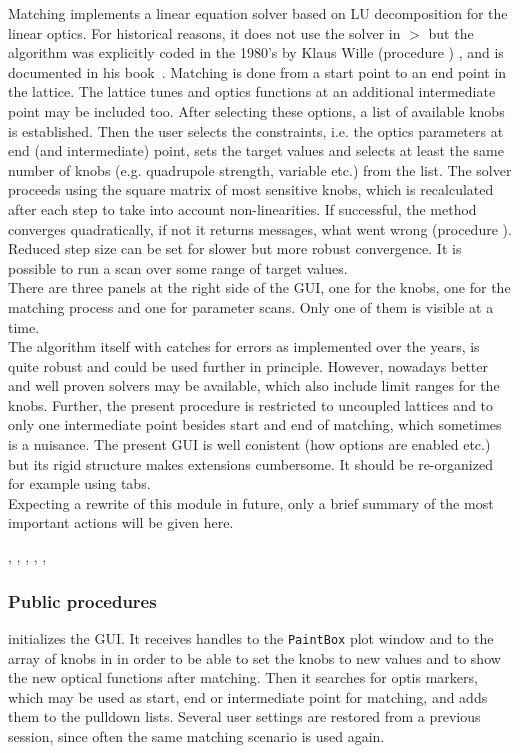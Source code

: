 \documentclass[12pt]{article}
\newcommand\code[1]{{\tt #1}}
\newcommand\guico[1]{{\color{blue}\code{#1}}}
\newcommand{\unico}[1]{{\color{burntorange}\code{#1}}}
\newcommand{\prcod}[2]{\opauni{#1}$>$\unico{#2}}
\newcommand{\opagui}[1]{\colorbox{blue!20}{{\color{black}\code{#1}}}}
\newcommand{\ogui}[1]{\hyperref[#1]{\opagui{#1}}}
\newcommand{\opaguif}[1]{\colorbox{violet!30}{{\color{black}\code{#1}}}}
\newcommand{\oguif}[1]{\hyperref[#1]{\opaguif{#1}}}
\newcommand{\opauni}[1]{\colorbox{orange!30}{{\color{black}\code{#1}}}}
\newcommand{\ouni}[1]{\hyperref[#1]{\opauni{#1}}}
\newcommand{\uses}[1]{\flushleft {\bf Uses:} #1}
\newcommand{\desc}[1]{#1}
\newcommand{\ppro}[1]{\subsubsection*{Public procedures} #1}
\newcommand{\todo}[1]{{\color{red} #1}}
\begin{document}
\desc{Matching implements a linear equation solver based on LU decomposition for the linear optics. For historical reasons, it does not use the solver in \prcod{mathlib}{LUDCMP,LUBKSB} but the algorithm was explicitly coded in the 1980's by Klaus Wille (procedure \guico{Step}) , and is documented in his book~\cite{kwille}. Matching is done from a start point to an end point in the lattice. The lattice tunes and optics functions at an additional intermediate point may be included too.  After selecting these options, a list of available knobs is established. Then the user selects the constraints, i.e. the optics parameters at end (and intermediate) point, sets the target values and selects at least the same number of knobs (e.g. quadrupole strength, variable etc.) from the list. The solver proceeds using the square matrix of most sensitive knobs, which is recalculated after each step to take into account non-linearities. If successful, the method converges quadratically, if not it returns messages, what went wrong (procedure \guico{Term}). Reduced step size can be set for slower but more robust convergence. It is possible to run a scan over some range of target values. \\
There are three panels at the right side of the GUI, one for the knobs, one for the matching process and one for parameter scans. Only one of them is visible at a time.\\
\todo{The algorithm itself with catches for errors as implemented over the years, is quite robust and could be used further in principle. However, nowadays better and well proven solvers may be available, which also include limit ranges for the knobs. Further, the present procedure is restricted to uncoupled lattices and to only one intermediate point besides start and end of matching, which sometimes is a nuisance. The present GUI is well conistent (how options are enabled etc.) but its rigid structure makes extensions cumbersome. It should be re-organized for example using tabs.}\\
Expecting a rewrite of this module in future, only a brief summary of the most important actions will be given here.}

\uses{\ouni{linoplib}, \oguif{knobframe}, \ogui{omatchscan}, \ouni{globlib},  \oguif{../com/asfigure}, \ouni{../com/asaux}} 

\ppro{
\guico{Load} initializes the GUI. It receives handles to the \code{PaintBox} plot window and to the array of \oguif{knobframe} knobs in \ogui{opalinop} in order to be able to set the knobs to new values and to show the new optical functions after matching. Then it searches for optis markers, which may be used as start, end or intermediate point for matching, and adds them to the \guico{ini/mat/midpoint} pulldown lists. Several user settings are restored from a previous session, since often the same matching scenario is used again.
}
\end{document}
